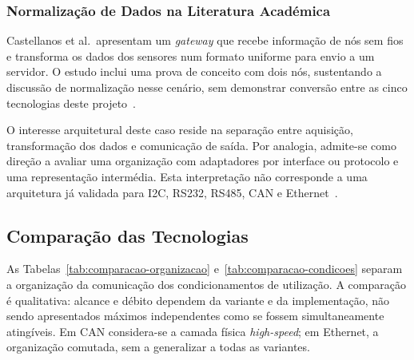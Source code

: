 \subsubsection{Normalização de Dados na Literatura Académica}

Castellanos et al.\ apresentam um \textit{gateway} que recebe informação
de nós sem fios e transforma os dados dos sensores num formato uniforme
para envio a um servidor. O estudo inclui uma prova de conceito com
dois nós, sustentando a discussão de normalização nesse cenário,
sem demonstrar conversão entre as cinco tecnologias deste
projeto~\cite{castellanos_gateway_2021}.

O interesse arquitetural deste caso reside na separação entre aquisição,
transformação dos dados e comunicação de saída. Por analogia, admite-se
como direção a avaliar uma organização com adaptadores por interface
ou protocolo e uma representação intermédia. Esta interpretação
não corresponde a uma arquitetura já validada para I2C, RS232, RS485,
CAN e Ethernet~\cite{castellanos_gateway_2021}.

\subsection{Comparação das Tecnologias}

As Tabelas~\ref{tab:comparacao-organizacao}
e~\ref{tab:comparacao-condicoes} separam a organização da comunicação
dos condicionamentos de utilização. A comparação é qualitativa:
alcance e débito dependem da variante e da implementação, não sendo
apresentados máximos independentes como se fossem simultaneamente
atingíveis. Em CAN considera-se a camada física \textit{high-speed};
em Ethernet, a organização comutada, sem a generalizar a todas
as variantes.

